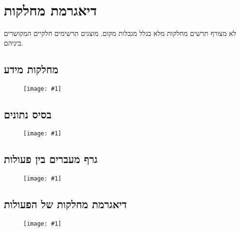 \newcommand{\classdiagram}[1]{
\begin{figure}[H]
  \centering
  \texttt{[image: \#1]}
\end{figure}
}
\section{דיאגרמת מחלקות}

לא מצורף תרשים מחלקות מלא בגלל מגבלות מקום.
מוצגים תרשימים חלקיים המקושרים ביניהם.

\subsection{מחלקות מידע}
\classdiagram{dataclassesUMLDiagram}

\subsection{בסיס נתונים}
\classdiagram{dbUMLDiagram}

\subsection{גרף מעברים בין פעולות}
\classdiagram{activitiesUMLDiagram}

\subsection{דיאגרמת מחלקות של הפעולות}
\classdiagram{activitiesClassesUMLDiagram}

\let\classdiagram\undefined